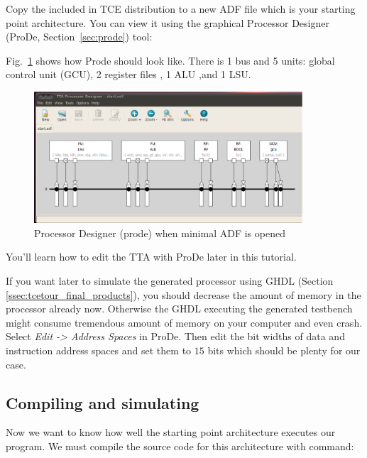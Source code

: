 \documentclass[twoside]{tceusermanual}
\begin{document}
Copy the  included in TCE distribution to a new ADF
file which is your starting point architecture. You can view it using the
graphical Processor Designer (ProDe, Section~\ref{sec:prode}) tool:



Fig.~\ref{fig:prode} shows how Prode should look like. There is 1 bus
and 5 units: global control unit (GCU), 2 register files , 1 ALU ,and
1 LSU.
\begin{figure}
  \begin{center}
    \includegraphics[width=10cm]{eps/prode_scrshot}
    \caption{Processor Designer (prode) when minimal ADF is opened}
    \label{fig:prode}
  \end{center}
\end{figure}

You'll learn how to edit the TTA with ProDe later in this tutorial.

If you want later to simulate the generated processor using GHDL
(Section \ref{ssec:tcetour_final_products}), you should decrease the
amount of memory in the processor already now. Otherwise the GHDL
executing the generated testbench might consume tremendous amount of
memory on your computer and even crash. Select
\textit{Edit -> Address Spaces} in ProDe. Then edit the bit widths of
data and instruction address spaces and set them to $15$ bits which
should be plenty for our case.


\subsection{Compiling and simulating}
\label{ssec:eval_start}
Now we want to know how well the starting point architecture executes
our program. We must compile the source code for this architecture
with command:

\end{document}
